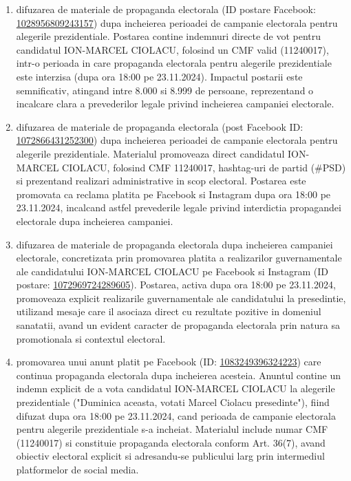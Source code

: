 \documentclass[a4paper,12pt]{article}
\begin{document}
\begin{enumerate}[leftmargin=*, label=\arabic*.)]
    \item difuzarea de materiale de propaganda electorala (ID postare Facebook: \href{https://www.facebook.com/ads/library/?id=1028956809243157}{1028956809243157}) dupa incheierea perioadei de campanie electorala pentru alegerile prezidentiale. Postarea contine indemnuri directe de vot pentru candidatul ION-MARCEL CIOLACU, folosind un CMF valid (11240017), intr-o perioada in care propaganda electorala pentru alegerile prezidentiale este interzisa (dupa ora 18:00 pe 23.11.2024). Impactul postarii este semnificativ, atingand intre 8.000 si 8.999 de persoane, reprezentand o incalcare clara a prevederilor legale privind incheierea campaniei electorale.
    \item difuzarea de materiale de propaganda electorala (post Facebook ID: \href{https://www.facebook.com/ads/library/?id=1072866431252300}{1072866431252300}) dupa incheierea perioadei de campanie electorala pentru alegerile prezidentiale. Materialul promoveaza direct candidatul ION-MARCEL CIOLACU, folosind CMF 11240017, hashtag-uri de partid (\#PSD) si prezentand realizari administrative in scop electoral. Postarea este promovata ca reclama platita pe Facebook si Instagram dupa ora 18:00 pe 23.11.2024, incalcand astfel prevederile legale privind interdictia propagandei electorale dupa incheierea campaniei.
    \item difuzarea de materiale de propaganda electorala dupa incheierea campaniei electorale, concretizata prin promovarea platita a realizarilor guvernamentale ale candidatului ION-MARCEL CIOLACU pe Facebook si Instagram (ID postare: \href{https://www.facebook.com/ads/library/?id=1072969724289605}{1072969724289605}). Postarea, activa dupa ora 18:00 pe 23.11.2024, promoveaza explicit realizarile guvernamentale ale candidatului la presedintie, utilizand mesaje care il asociaza direct cu rezultate pozitive in domeniul sanatatii, avand un evident caracter de propaganda electorala prin natura sa promotionala si contextul electoral.
    \item promovarea unui anunt platit pe Facebook (ID: \href{https://www.facebook.com/ads/library/?id=1083249396324223}{1083249396324223}) care continua propaganda electorala dupa incheierea acesteia. Anuntul contine un indemn explicit de a vota candidatul ION-MARCEL CIOLACU la alegerile prezidentiale ("Duminica aceasta, votati Marcel Ciolacu presedinte"), fiind difuzat dupa ora 18:00 pe 23.11.2024, cand perioada de campanie electorala pentru alegerile prezidentiale s-a incheiat. Materialul include numar CMF (11240017) si constituie propaganda electorala conform Art. 36(7), avand obiectiv electoral explicit si adresandu-se publicului larg prin intermediul platformelor de social media.

\end{enumerate}
\end{document}
